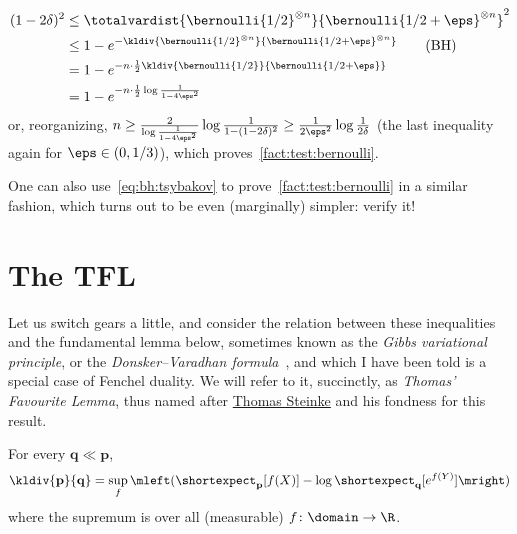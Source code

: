\documentclass[10pt]{article}
\newcommand{\ns}{n}
\newcommand{\p}{\mathbf{p}}
\newcommand{\q}{\mathbf{q}}
\begin{document}
\begin{align*}
    (1-2\delta)^2 
    &\leq \totalvardist{\bernoulli{1/2}^{\otimes\ns}}{\bernoulli{1/2+\eps}^{\otimes\ns}}^2    \\
    &\leq 1- e^{-\kldiv{\bernoulli{1/2}^{\otimes\ns}}{\bernoulli{1/2+\eps}^{\otimes\ns}}}  \tag{BH}\\
    &= 1-e^{-\ns\cdot \frac{1}{2}\kldiv{\bernoulli{1/2}}{\bernoulli{1/2+\eps}}}  \\
    &= 1-e^{-\ns\cdot \frac{1}{2}\log\frac{1}{1-4\eps^2}}
\end{align*}
or, reorganizing, $\ns\geq \frac{2}{\log\frac{1}{1-4\eps^2}}\log\frac{1}{1-(1-2\delta)^2} \geq \frac{1}{2\eps^2}\log\frac{1}{2\delta}$ (the last inequality again for $\eps\in(0,1/3)$), which proves~\autoref{fact:test:bernoulli}.

\begin{remark}
  One can also use~\eqref{eq:bh:tsybakov} to prove~\autoref{fact:test:bernoulli} in a similar fashion, which turns out to be even (marginally) simpler: verify it!
\end{remark}

\section{The TFL}
  \label{sec:tfl}
Let us switch gears a little, and consider the relation between these inequalities and the fundamental lemma below, sometimes known as the \emph{Gibbs variational principle}, or the \emph{Donsker--Varadhan formula}~\cite{DonskerV75}, and which I have been told is a special case of Fenchel duality. We will refer to it, succinctly, as \emph{Thomas' Favourite Lemma}, thus named after \href{http://www.thomas-steinke.net/}{Thomas Steinke} and his fondness for this result.
\begin{lemma}
  \label{lemma:tfl}
For every $\q\ll\p$, 
\[
    \kldiv{\p}{\q} = \sup_f \mleft( \shortexpect_{\p}[f(X)] - \log \shortexpect_{\q}[e^{f(Y)}] \mright)
\]
where the supremum is over all (measurable) $f\colon\domain\to\R$.
\end{lemma}
\end{document}
